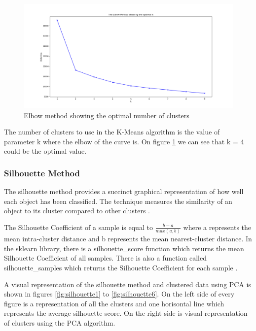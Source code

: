 \documentclass[times, utf8, zavrsni, numeric]{fer}
\begin{document}
\begin{figure}[H]
    \centering
    \includegraphics[width=\linewidth]{figures/elbow_method}
    \caption{Elbow method showing the optimal number of clusters}
    \label{fig:elbowMethod}
\end{figure}

The number of clusters to use in the K-Means algorithm is the value of parameter k where 
the elbow of the curve is. On figure \ref{fig:elbowMethod} we can see that k = 4 could be the optimal value.

\subsubsection{Silhouette Method}
The silhouette method provides a succinct graphical representation of how well each object has been classified.
The technique measures the similarity of an object to its cluster compared to other clusters \cite{optimalKmethods}.

The Silhouette Coefficient of a sample is equal to  $ \frac{b - a}{max(a, b)}$ where a represents
the mean intra-cluster distance and b represents the mean nearest-cluster distance.
In the sklearn library, there is a silhouette\_score function which returns the mean 
Silhouette Coefficient of all samples. There is also a function called silhouette\_samples 
which returns the Silhouette Coefficient for each sample \cite{silhouetteSamples}.

A visual representation of the silhouette method and clustered data using PCA is shown in figures
\ref{fig:silhouette1} to \ref{fig:silhouette6}. On the left side of every figure is a
representation of all the clusters and one horisontal line which represents the average 
silhouette score. On the right side is visual representation of clusters using the PCA 
algorithm.
\end{document}
